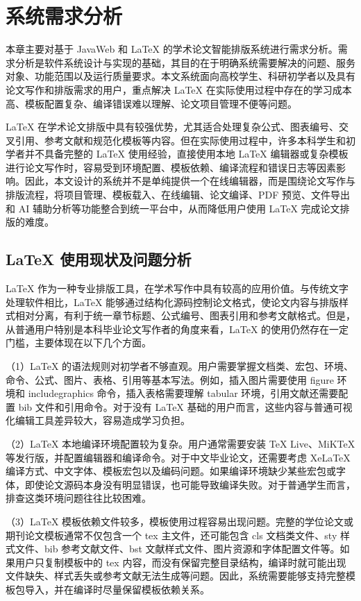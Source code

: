 \documentclass{xduugthesis}
\begin{document}
\chapter{系统需求分析}
本章主要对基于 JavaWeb 和 LaTeX 的学术论文智能排版系统进行需求分析。需求分析是软件系统设计与实现的基础，其目的在于明确系统需要解决的问题、服务对象、功能范围以及运行质量要求\cite{sommerville2015software}。本文系统面向高校学生、科研初学者以及具有论文写作和排版需求的用户，重点解决 LaTeX 在实际使用过程中存在的学习成本高、模板配置复杂、编译错误难以理解、论文项目管理不便等问题。

LaTeX 在学术论文排版中具有较强优势，尤其适合处理复杂公式、图表编号、交叉引用、参考文献和规范化模板等内容。但在实际使用过程中，许多本科学生和初学者并不具备完整的 LaTeX 使用经验，直接使用本地 LaTeX 编辑器或复杂模板进行论文写作时，容易受到环境配置、模板依赖、编译流程和错误日志等因素影响。因此，本文设计的系统并不是单纯提供一个在线编辑器，而是围绕论文写作与排版流程，将项目管理、模板载入、在线编辑、论文编译、PDF 预览、文件导出和 AI 辅助分析等功能整合到统一平台中，从而降低用户使用 LaTeX 完成论文排版的难度。

\section{LaTeX 使用现状及问题分析}
LaTeX 作为一种专业排版工具，在学术写作中具有较高的应用价值。与传统文字处理软件相比，LaTeX 能够通过结构化源码控制论文格式，使论文内容与排版样式相对分离，有利于统一章节标题、公式编号、图表引用和参考文献格式。但是，从普通用户特别是本科毕业论文写作者的角度来看，LaTeX 的使用仍然存在一定门槛，主要体现在以下几个方面。

（1）LaTeX 的语法规则对初学者不够直观。用户需要掌握文档类、宏包、环境、命令、公式、图片、表格、引用等基本写法。例如，插入图片需要使用 figure 环境和 includegraphics 命令，插入表格需要理解 tabular 环境，引用文献还需要配置 bib 文件和引用命令。对于没有 LaTeX 基础的用户而言，这些内容与普通可视化编辑工具差异较大，容易造成学习负担。

（2）LaTeX 本地编译环境配置较为复杂。用户通常需要安装 TeX Live、MiKTeX 等发行版，并配置编辑器和编译命令。对于中文毕业论文，还需要考虑 XeLaTeX 编译方式、中文字体、模板宏包以及编码问题。如果编译环境缺少某些宏包或字体，即使论文源码本身没有明显错误，也可能导致编译失败。对于普通学生而言，排查这类环境问题往往比较困难。

（3）LaTeX 模板依赖文件较多，模板使用过程容易出现问题。完整的学位论文或期刊论文模板通常不仅包含一个 tex 主文件，还可能包含 cls 文档类文件、sty 样式文件、bib 参考文献文件、bst 文献样式文件、图片资源和字体配置文件等。如果用户只复制模板中的 tex 内容，而没有保留完整目录结构，编译时就可能出现文件缺失、样式丢失或参考文献无法生成等问题。因此，系统需要能够支持完整模板包导入，并在编译时尽量保留模板依赖关系。
\end{document}

